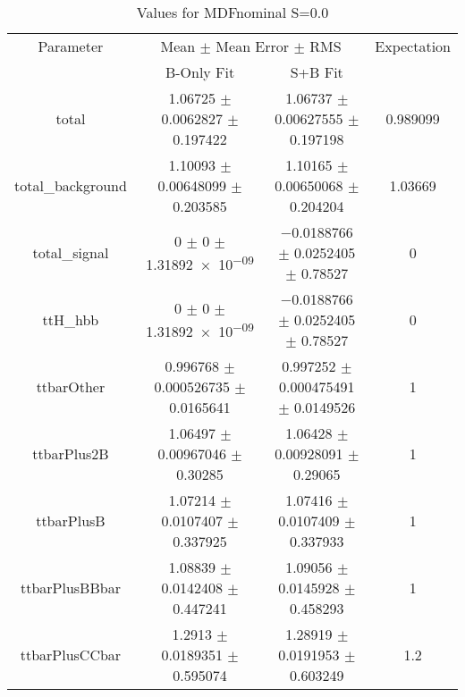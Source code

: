 \begin{table}
\centering
\caption{Values for MDFnominal S=0.0}
\begin{tabular}{cccc}
\toprule
Parameter & \multicolumn{2}{c}{Mean $\pm$ Mean Error $\pm$ RMS} & Expectation\\
 & B-Only Fit & S+B Fit & \\
\midrule
total & \num{1.06725} $\pm$ \num{0.0062827} $\pm$ \num{0.197422} & \num{1.06737} $\pm$ \num{0.00627555} $\pm$ \num{0.197198} & \num{0.989099}\\
total\_background & \num{1.10093} $\pm$ \num{0.00648099} $\pm$ \num{0.203585} & \num{1.10165} $\pm$ \num{0.00650068} $\pm$ \num{0.204204} & \num{1.03669}\\
total\_signal & \num{0} $\pm$ \num{0} $\pm$ \num{1.31892e-09} & \num{-0.0188766} $\pm$ \num{0.0252405} $\pm$ \num{0.78527} & \num{0}\\
ttH\_hbb & \num{0} $\pm$ \num{0} $\pm$ \num{1.31892e-09} & \num{-0.0188766} $\pm$ \num{0.0252405} $\pm$ \num{0.78527} & \num{0}\\
ttbarOther & \num{0.996768} $\pm$ \num{0.000526735} $\pm$ \num{0.0165641} & \num{0.997252} $\pm$ \num{0.000475491} $\pm$ \num{0.0149526} & \num{1}\\
ttbarPlus2B & \num{1.06497} $\pm$ \num{0.00967046} $\pm$ \num{0.30285} & \num{1.06428} $\pm$ \num{0.00928091} $\pm$ \num{0.29065} & \num{1}\\
ttbarPlusB & \num{1.07214} $\pm$ \num{0.0107407} $\pm$ \num{0.337925} & \num{1.07416} $\pm$ \num{0.0107409} $\pm$ \num{0.337933} & \num{1}\\
ttbarPlusBBbar & \num{1.08839} $\pm$ \num{0.0142408} $\pm$ \num{0.447241} & \num{1.09056} $\pm$ \num{0.0145928} $\pm$ \num{0.458293} & \num{1}\\
ttbarPlusCCbar & \num{1.2913} $\pm$ \num{0.0189351} $\pm$ \num{0.595074} & \num{1.28919} $\pm$ \num{0.0191953} $\pm$ \num{0.603249} & \num{1.2}\\
\bottomrule
\end{tabular}
\end{table}